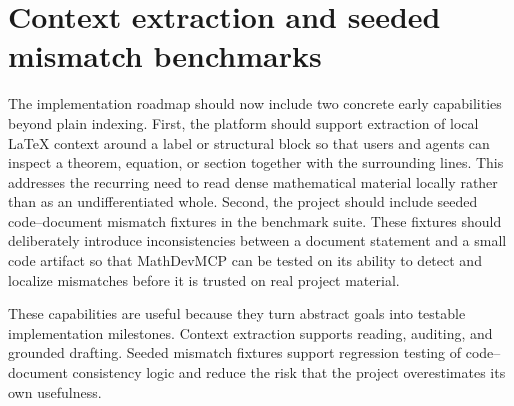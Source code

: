 \section{Context extraction and seeded mismatch benchmarks}

The implementation roadmap should now include two concrete early capabilities beyond plain indexing. First, the platform should support extraction of local LaTeX context around a label or structural block so that users and agents can inspect a theorem, equation, or section together with the surrounding lines. This addresses the recurring need to read dense mathematical material locally rather than as an undifferentiated whole. Second, the project should include seeded code--document mismatch fixtures in the benchmark suite. These fixtures should deliberately introduce inconsistencies between a document statement and a small code artifact so that MathDevMCP can be tested on its ability to detect and localize mismatches before it is trusted on real project material.

These capabilities are useful because they turn abstract goals into testable implementation milestones. Context extraction supports reading, auditing, and grounded drafting. Seeded mismatch fixtures support regression testing of code--document consistency logic and reduce the risk that the project overestimates its own usefulness.
